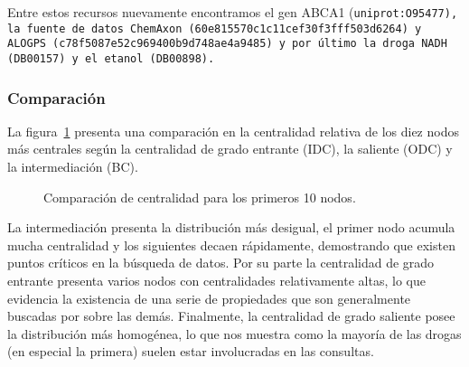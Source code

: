 Entre estos recursos nuevamente encontramos el gen ABCA1 (\tt{uniprot:O95477}),
la fuente de datos ChemAxon (\tt{60e815570c1c11cef30f3fff503d6264}) y ALOGPS
(\tt{c78f5087e52c969400b9d748ae4a9485}) y por último la droga
NADH (\tt{DB00157}) y el etanol (\tt{DB00898}).

\subsubsection{Comparación}
La figura~\ref{fig:compcent} presenta una comparación en la centralidad relativa
de los diez nodos más centrales según la centralidad de grado entrante (IDC), la
saliente (ODC) y la intermediación (BC).
\begin{figure}[h]
  \caption{Comparación de centralidad para los primeros 10 nodos.}
  \label{fig:compcent}
\end{figure}

La intermediación presenta la distribución más desigual, el primer nodo acumula
mucha centralidad y los siguientes decaen rápidamente, demostrando que existen
puntos críticos en la búsqueda de datos.
Por su parte la centralidad de grado entrante presenta varios nodos con
centralidades relativamente altas, lo que evidencia la existencia de una serie
de propiedades que son generalmente buscadas por sobre las demás.
Finalmente, la centralidad de grado saliente posee la distribución más
homogénea, lo que nos muestra como la mayoría de las drogas (en especial la
primera) suelen estar involucradas en las consultas.

